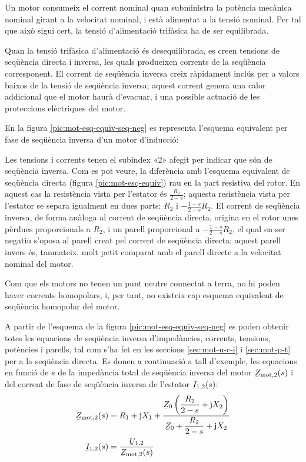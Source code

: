 Un motor consumeix el corrent nominal quan subministra la potència mecànica nominal girant a la velocitat nominal, i està alimentat a la tensió nominal. Per tal que això sigui cert, la tensió d'alimentació trifàsica ha de ser equilibrada.

Quan la tensió trifàsica d'alimentació és desequilibrada, es creen tensions de seqüència directa i inversa, les quals  produeixen corrents de la seqüència corresponent. El corrent de seqüència inversa creix ràpidament inclús per a valors baixos de  la tensió de seqüència inversa; aquest corrent genera una calor addicional que el motor haurà d'evacuar, i una possible actuació de les proteccions elèctriques del motor.

En la figura \vref{pic:mot-esq-equiv-seq-neg} es representa l'esquema equivalent per fase de seqüència inversa d'un   motor d'inducció:

\begin{center}
	
	\label{pic:mot-esq-equiv-seq-neg}
\end{center}

Les tensions i corrents tenen el subíndex «2» afegit per indicar que són de seqüència inversa. Com es pot veure, la diferència amb l'esquema equivalent de seqüència directa (figura \vref{pic:mot-esq-equiv}) rau en la part resistiva del rotor. En aquest cas la resistència vista per l'estator és $\frac{R_2}{2-s}$; aquesta resistència vista per l'estator se separa igualment en dues parts: $R_2$ i $-\frac{1-s}{2-s} R_2$. El corrent de seqüència inversa, de forma anàloga al corrent de seqüència directa,  origina en el rotor unes pèrdues proporcionals a $R_2$, i un parell proporcional a $-\frac{1-s}{2-s} R_2$, el qual en ser negatiu s'oposa al parell creat pel corrent de seqüència directa; aquest parell invers és, tanmateix, molt petit comparat amb el parell directe a la velocitat nominal del motor.

Com que els motors no tenen un punt neutre connectat a terra, no hi poden haver corrents homopolars, i, per tant, no existeix cap esquema equivalent de seqüència homopolar del motor.

A partir de l'esquema de la figura \vref{pic:mot-esq-equiv-seq-neg} es poden obtenir totes les equacions de seqüència inversa d'impedàncies, corrents, tensions, potències i parells, tal com s'ha fet en les seccions \ref{sec:mot-u-c-i} i \ref{sec:mot-p-t} per a la seqüència directa. Es donen a continuació a tall d'exemple, les equacions en funció de $s$ de la impedància total de seqüència inversa del motor $\cmplx{Z}\ped{mot,2}(s)$ i del corrent de fase de seqüència inversa de l'estator $\cmplx{I}_{1,2}(s)$:
\begin{align}
	\cmplx{Z}\ped{mot,2}(s) &= R_1 + \ju X_1 + \frac{\cmplx{Z}_0 \left( \dfrac{R_2}{2-s} + \ju X_2\right)}{\cmplx{Z}_0 +  \dfrac{R_2}{2-s} + \ju X_2}\label{eq:mot-Zmot-inv}\\
	\cmplx{I}_{1,2}(s) &= \frac{\cmplx{U}_{1,2}}{\cmplx{Z}\ped{mot,2}(s)}\label{eq:mot-I1-inv}
\end{align}


